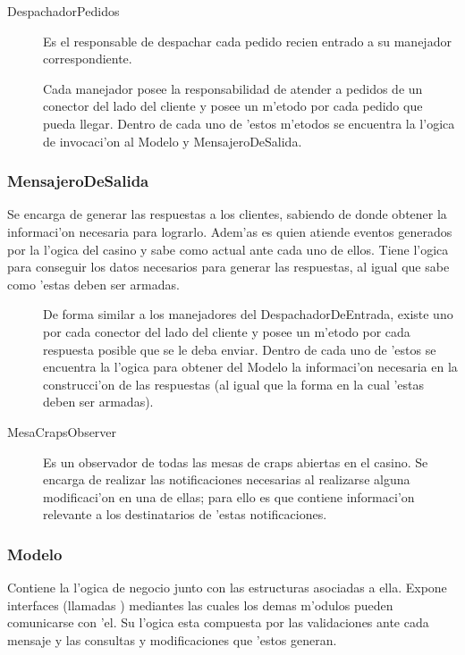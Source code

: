 
\begin{description}
\item[DespachadorPedidos] Es el responsable de despachar cada pedido recien entrado a su manejador correspondiente.
\item[] Cada manejador posee la responsabilidad de atender a pedidos de un conector del lado del cliente y posee un m'etodo por cada pedido que pueda llegar. Dentro de cada uno de 'estos m'etodos se encuentra la l'ogica de invocaci'on al Modelo y MensajeroDeSalida.
\end{description}


\subsubsection{MensajeroDeSalida}
Se encarga de generar las respuestas a los clientes, sabiendo de donde obtener la informaci'on necesaria para lograrlo. Adem'as es quien atiende eventos generados por la l'ogica del casino y sabe como actual ante cada uno de ellos. Tiene l'ogica para conseguir los datos necesarios para generar las respuestas, al igual que sabe como 'estas deben ser armadas.


\begin{description}
\item[] De forma similar a los manejadores del DespachadorDeEntrada, existe uno por cada conector del lado del cliente y posee un m'etodo por cada respuesta posible que se le deba enviar. Dentro de cada uno de 'estos se encuentra la l'ogica para obtener del Modelo la informaci'on necesaria en la construcci'on de las respuestas (al igual que la forma en la cual 'estas deben ser armadas).
\item[MesaCrapsObserver] Es un observador de todas las mesas de craps abiertas en el casino. Se encarga de realizar las notificaciones necesarias al realizarse alguna modificaci'on en una de ellas; para ello es que contiene informaci'on relevante a los destinatarios de 'estas notificaciones.
\end{description}


\subsubsection{Modelo}
Contiene la l'ogica de negocio junto con las estructuras asociadas a ella. Expone interfaces (llamadas ) mediantes las cuales los demas m'odulos pueden comunicarse con 'el. Su l'ogica esta compuesta por las validaciones ante cada mensaje y las consultas y modificaciones que 'estos generan. 

